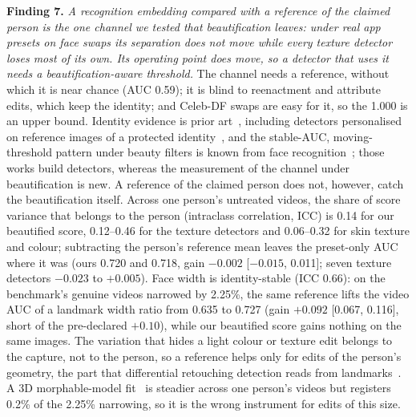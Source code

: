 \documentclass[journal]{IEEEtran}  %
\begin{document}
\textbf{Finding 7.} \emph{A recognition embedding compared with a reference of the claimed person is the one channel we tested that beautification leaves: under real app presets on face swaps its separation does not move while every texture detector loses most of its own. Its operating point does move, so a detector that uses it needs a beautification-aware threshold.} The channel
needs a reference, without which it is near chance (AUC 0.59); it is blind to reenactment and attribute edits, which keep the
identity; and Celeb-DF swaps are easy for it, so the 1.000 is an upper bound. Identity evidence is prior art~\cite{identitydriven2020,idreveal2021,ict2022,yin2026}, including detectors personalised on reference images of a protected identity~\cite{vipguard2025}, and the stable-AUC, moving-threshold pattern under beauty filters is known from face recognition~\cite{mirabet2025}; those works build detectors, whereas the measurement of the channel under beautification is new.
A reference of the claimed person does not, however, catch the beautification itself. Across one person's untreated
videos, the share of score variance that belongs to the person (intraclass correlation, ICC) is 0.14 for our beautified score,
0.12--0.46 for the texture detectors and 0.06--0.32 for skin texture and colour; subtracting the person's reference mean leaves
the preset-only AUC where it was (ours 0.720 and 0.718, gain $-0.002$ [$-0.015$, 0.011]; seven texture detectors $-0.023$ to
$+0.005$). Face width is identity-stable (ICC 0.66): on the benchmark's genuine videos narrowed by 2.25\%, the same reference
lifts the video AUC of a landmark width ratio from 0.635 to 0.727 (gain $+0.092$ [0.067, 0.116], short of the pre-declared
$+0.10$), while our beautified score gains nothing on the same images. The variation that hides a light colour or texture edit
belongs to the capture, not to the person, so a reference helps only for edits of the person's geometry, the part that
differential retouching detection reads from landmarks~\cite{rathgeb2020diff}. A 3D morphable-model fit~\cite{tddfav2} is
steadier across one person's videos but registers 0.2\% of the 2.25\% narrowing, so it is the wrong instrument for edits of
this size.
\end{document}
